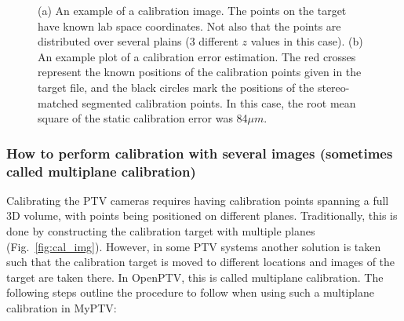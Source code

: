 \documentclass[10pt,a4paper]{article}
\begin{document}
\begin{figure}[h!]
	\centering
	\hfill
	\caption{(a) An example of a calibration image. The points on the target have known lab space coordinates. Not also that the points are distributed over several plains (3 different $z$ values in this case). (b) An example plot of a calibration error estimation. The red crosses represent the known positions of the calibration points given in the target file, and the black circles mark the positions of the stereo-matched segmented calibration points. In this case, the root mean square of the static calibration error was 84$\mu m$.}
\end{figure}







\subsubsection{How to perform calibration with several images (sometimes called multiplane calibration)}\label{sec:multiplane_cal}



Calibrating the PTV cameras requires having calibration points spanning a full 3D volume, with points being positioned on different planes. Traditionally, this is done by constructing the calibration target with multiple planes (Fig.~\ref{fig:cal_img}).
However, in some PTV systems another solution is taken such that the calibration target is moved to different locations and images of the target are taken there. In OpenPTV, this is called multiplane calibration. The following steps outline the procedure to follow when using such a multiplane calibration in MyPTV:
\end{document}
